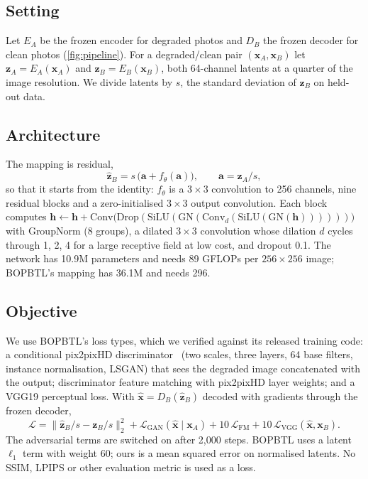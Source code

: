 \documentclass[10pt,twocolumn,letterpaper]{article}
\newcommand{\zA}{\bm{z}_A}
\newcommand{\zB}{\bm{z}_B}
\newcommand{\hzB}{\hat{\bm{z}}_B}
\begin{document}
\subsection{Setting}
Let $E_A$ be the frozen encoder for degraded photos and $D_B$ the frozen decoder for clean photos (\cref{fig:pipeline}).
For a degraded/clean pair $(\bm{x}_A,\bm{x}_B)$ let $\zA=E_A(\bm{x}_A)$ and $\zB=E_B(\bm{x}_B)$, both 64-channel latents at
a quarter of the image resolution. We divide latents by $s$, the standard deviation of $\zB$ on held-out data.

\subsection{Architecture}
\label{sec:arch}
The mapping is residual,
\begin{equation}
  \hzB=s\,\big(\bm{a}+f_\theta(\bm{a})\big),\qquad \bm{a}=\zA/s ,
  \label{eq:mapping}
\end{equation}
so that it starts from the identity: $f_\theta$ is a $3{\times}3$ convolution to 256 channels, nine residual blocks and a
zero-initialised $3{\times}3$ output convolution. Each block computes
$\bm{h}\leftarrow\bm{h}+\mathrm{Conv}\big(\mathrm{Drop}(\mathrm{SiLU}(\mathrm{GN}(\mathrm{Conv}_d(\mathrm{SiLU}(\mathrm{GN}(\bm{h}))))))\big)$
with GroupNorm (8 groups), a dilated $3{\times}3$ convolution whose dilation $d$ cycles through 1, 2, 4 for a large
receptive field at low cost, and dropout 0.1. The network has 10.9M parameters and needs 89 GFLOPs per $256{\times}256$
image; BOPBTL's mapping has 36.1M and needs 296.

\subsection{Objective}
\label{sec:objective}
We use BOPBTL's loss types, which we verified against its released training code: a conditional pix2pixHD
discriminator~\cite{wang2018pix2pixhd} (two scales, three layers, 64 base filters, instance normalisation, LSGAN) that
sees the degraded image concatenated with the output; discriminator feature matching with pix2pixHD layer weights; and a
VGG19 perceptual loss. With $\hat{\bm{x}}=D_B(\hzB)$ decoded with gradients through the frozen decoder,
\begin{equation}
  \mathcal{L}=\big\|\hzB/s-\zB/s\big\|_2^2+\mathcal{L}_{\text{GAN}}(\hat{\bm{x}}\mid\bm{x}_A)
  +10\,\mathcal{L}_{\text{FM}}+10\,\mathcal{L}_{\text{VGG}}(\hat{\bm{x}},\bm{x}_B).
  \label{eq:loss}
\end{equation}
The adversarial terms are switched on after 2{,}000 steps. BOPBTL uses a latent $\ell_1$ term with weight 60; ours is a
mean squared error on normalised latents. No SSIM, LPIPS or other evaluation metric is used as a loss.
\end{document}
